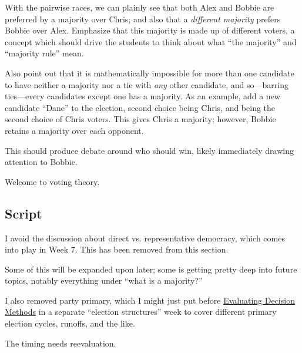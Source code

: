 With the pairwise races, we can plainly see that both Alex and Bobbie are preferred by a majority over Chris; and also that a \textit{different majority} prefers Bobbie over Alex.  Emphasize that this majority is made up of different voters, a concept which should drive the students to think about what ``the majority'' and ``majority rule'' mean.

Also point out that it is mathematically impossible for more than one candidate to have neither a majority nor a tie with \textit{any} other candidate, and so—barring ties—every candidates except one has a majority.  As an example, add a new candidate ``Dane'' to the election, second choice being Chris, and being the second choice of Chris voters.  This gives Chris a majority; however, Bobbie retains a majority over each opponent.

This should produce debate around who should win, likely immediately drawing attention to Bobbie.

Welcome to voting theory.

\subsection{Script}

\begin{boxcomment}
    I avoid the discussion about direct vs. representative democracy, which comes into play in Week 7.  This has been removed from this section.
\end{boxcomment}

\begin{boxcomment}
    Some of this will be expanded upon later; some is getting pretty deep into future topics, notably everything under ``what is a majority?''
\end{boxcomment}

\begin{todo}

    I also removed party primary, which I might just put before \hyperref[cur:evaluating-decision-methods]{Evaluating Decision Methods} in a separate ``election structures'' week to cover different primary election cycles, runoffs, and the like.

    The timing needs reevaluation.
\end{todo}

